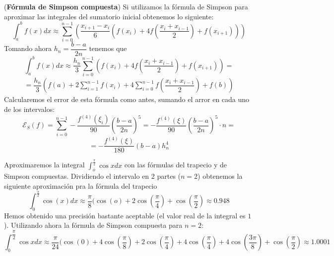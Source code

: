  \begin{ejem}
    (\textbf{Fórmula de Simpson compuesta}) Si utilizamos la fórmula de Simpson para aproximar las integrales del sumatorio inicial obtenemos lo siguiente:
    $$\int_a^bf(x)dx\approx\sum_{i=0}^{n-1}\left(\dfrac{x_{i+1}-x_i}{6}(f(x_i)+4f\left(\dfrac{x_i+x_{i-1}}{2}\right)+f(x_{i+1}))\right)$$
    Tomando ahora $h_n=\dfrac{b-a}{2n}$ tenemos que
    $$\int_a^bf(x)dx\approx\dfrac{h_n}{3}\sum_{i=0}^{n-1}(f(x_i)+4f\left(\dfrac{x_i+x_{i-1}}{2}\right)+f(x_{i+1}))=$$
    \begin{align}
    =\dfrac{h_n}{3}\left(f(a)+2\sum_{i=1}^{n-1}f(x_i)+4\sum_{i=0}^{n-1}f\left(\dfrac{x_i+x_{i-1}}{2}\right)+f(b)\right)
    \label{simp:comp}     
    \end{align}
    Calcularemos el error de esta fórmula como antes, sumando el arror en cada uno de los intervalos:
    $$\mathcal{E}_S(f)=\sum_{i=0}^{n-1}-\dfrac{f^{(4)}(\xi_i)}{90}\left(\dfrac{b-a}{2n}\right)^5=-\dfrac{f^{(4)}(\xi)}{90}\left(\dfrac{b-a}{2n}\right)^5\cdot n=$$
    $$=-\dfrac{f^{(4)}(\xi)}{180}(b-a)h_n^4$$
 \end{ejem}
  \begin{ejem}
Aproximaremos la integral $\int_o^{\frac{\pi}{2}}\cos x dx$ con las fórmulas del trapecio y de Simpson compuestas. Dividiendo el intervalo en 2 partes ($n=2$) obtenemos la siguiente aproximación pra la fórmula del trapecio
 $$\int_0^{\frac{\pi}{2}}\cos (x) dx\approx \dfrac{\pi}{8}(\cos(o)+2\cos\left(\dfrac{\pi}{4}\right)+\cos\left(\dfrac{\pi}{2}\right)\approx 0.948$$
 Hemos obtenido una precisión bastante aceptable (el valor real de la integral es $1$). Utilizando ahora la fórmula de Simpson compuesta para $n=2$:
 $$\int_0^{\dfrac{\pi}{2}}\cos x dx\approx\dfrac{\pi}{24}(\cos(0)+4\cos\left(\dfrac{\pi}{8}\right)+2\cos\left(\dfrac{\pi}{4}\right)+4\cos\left(\dfrac{\pi}{4}\right)+4\cos\left(\dfrac{3\pi}{8}\right)+\cos\left(\dfrac{\pi}{2}\right)\approx1.0001$$
 \end{ejem}

